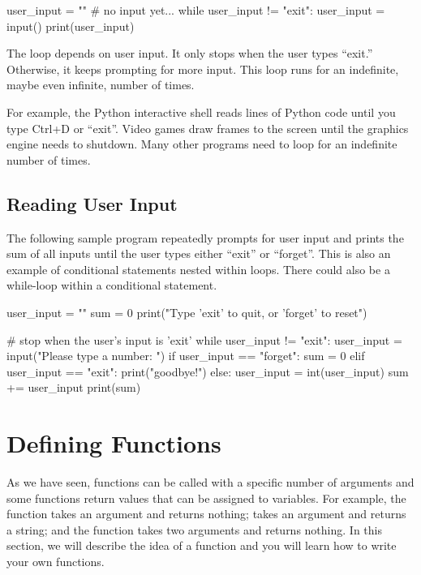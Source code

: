 \documentclass[11pt]{cselabheader}
\begin{document}
{\begin{python3code}
user_input = ""  # no input yet...
while user_input != "exit":
    user_input = input()
    print(user_input)
\end{python3code}

The  loop depends on user input.
It only stops when the user types ``exit.''
Otherwise, it keeps prompting for more input.
This loop runs for an indefinite, maybe even infinite,
number of times.

For example, the Python interactive shell reads lines of
Python code until you type Ctrl+D or ``exit''.
Video games draw frames to the screen until the graphics engine
needs to shutdown.
Many other programs need to loop for an indefinite number of times.


\subsection{Reading User Input}

The following sample program repeatedly prompts for user
input and prints the sum of all inputs until the user types either
``exit'' or ``forget''.
This is also an example of conditional statements nested within
 loops. There could also be a
while-loop within a conditional statement.

\begin{python3code}
user_input = ""
sum = 0
print("Type 'exit' to quit, or 'forget' to reset")

# stop when the user's input is 'exit'
while user_input != "exit":
    user_input = input("Please type a number: ")
    if user_input == "forget":
        sum = 0
    elif user_input == "exit":
        print("goodbye!")
    else:
        user_input = int(user_input)
        sum += user_input
        print(sum)
\end{python3code}

\section{Defining Functions}

As we have seen, functions can be called with a specific
number of arguments and some functions return values that
can be assigned to variables.
For example, the 
function takes an argument and returns nothing;
 takes an argument and
returns a string; and the 
function takes two arguments and returns nothing.
In this section, we will describe the idea of a function and you will
learn how to write your own functions.

}
\end{document}
